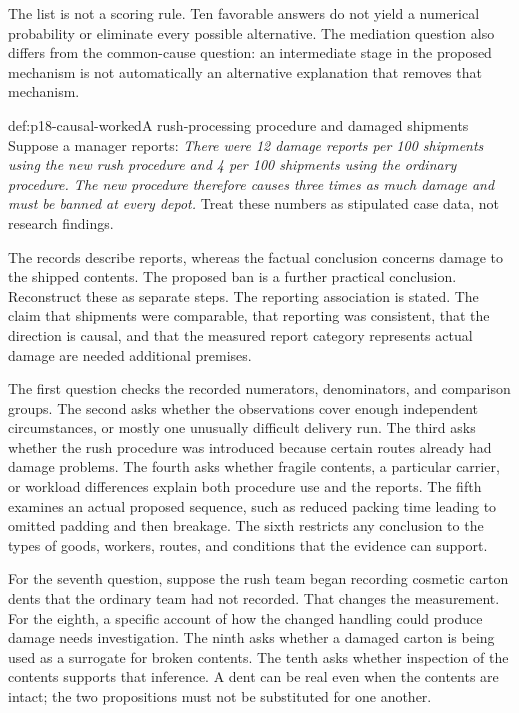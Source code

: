 The list is not a scoring rule. Ten favorable answers do not yield
a numerical probability or eliminate every possible alternative.
The mediation question also differs from the common-cause question:
an intermediate stage in the proposed mechanism is not automatically
an alternative explanation that removes that mechanism.

\begin{hbexample}{def:p18-causal-worked}{A rush-processing procedure and damaged shipments}
Suppose a manager reports:
\emph{There were 12 damage reports per 100 shipments using the new
rush procedure and 4 per 100 shipments using the ordinary procedure.
The new procedure therefore causes three times as much damage and
must be banned at every depot.}
Treat these numbers as stipulated case data, not research findings.

The records describe reports, whereas the factual conclusion concerns
damage to the shipped contents. The proposed ban is a further practical
conclusion. Reconstruct these as separate steps. The reporting association
is stated. The claim that shipments were comparable, that reporting was
consistent, that the direction is causal, and that the measured report
category represents actual damage are needed additional premises.

The first question checks the recorded numerators, denominators, and
comparison groups. The second asks whether the observations cover enough
independent circumstances, or mostly one unusually difficult delivery run.
The third asks whether the rush procedure was introduced because certain
routes already had damage problems. The fourth asks whether fragile
contents, a particular carrier, or workload differences explain both
procedure use and the reports.
The fifth examines an actual proposed sequence, such as reduced packing
time leading to omitted padding and then breakage.
The sixth restricts any conclusion to the types of goods, workers,
routes, and conditions that the evidence can support.

For the seventh question, suppose the rush team began recording cosmetic
carton dents that the ordinary team had not recorded. That changes the
measurement. For the eighth, a specific account of how the changed
handling could produce damage needs investigation.
The ninth asks whether a damaged carton is being used as a surrogate
for broken contents. The tenth asks whether inspection of the contents
supports that inference. A dent can be real even when the contents
are intact; the two propositions must not be substituted for one another.


\end{hbexample}
